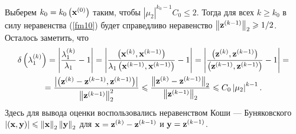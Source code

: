\documentclass[12pt]{article}
\begin{document}
	Выберем $k_0=k_0\left(\bold{x}^{\left(0\right)}\right)$ таким, чтобы $\left|\mu_2\right|^{k_0-1}C_0\leqslant 2$. Тогда для всех $k\geqslant k_0$ в силу неравенства (\ref{fm10}) будет справедливо неравенство $\left\|\bold{z}^{\left(k-1\right)}\right\|_2\geqslant 1/2$. Осталось заметить, что
	\begin{equation}
		\begin{gathered}
		\delta\left(\lambda_1^{\left(k\right)}\right)=\left|\frac{\lambda_1^{\left(k\right)}}{\lambda_1}-1\right|=\left|\frac{\left(\bold{x}^{\left(k\right)},\bold{x}^{\left(k-1\right)}\right)}{\lambda_1 \left(\bold{x}^{\left(k-1\right)},\bold{x}^{\left(k-1\right)}\right)}-1\right|=\left|\frac{\left(\bold{z}^{\left(k\right)},\bold{z}^{\left(k-1\right)}\right)}{\left(\bold{z}^{\left(k-1\right)},\bold{z}^{\left(k-1\right)}\right)}-1\right|=\\
		=\frac{\left|\left(\bold{z}^{\left(k\right)}-\bold{z}^{\left(k-1\right)},\bold{z}^{\left(k-1\right)}\right)\right|}{\left\|\bold{z}^{\left(k-1\right)}\right\|^2_2}\leqslant\frac{\left\|\bold{z}^{\left(k\right)}-\bold{z}^{\left(k-1\right)}\right\|_2}{\left\|\bold{z}^{\left(k-1\right)}\right\|_2}\leqslant C_0\left|\mu_2\right|^{k-1}.
		\end{gathered}
	\end{equation}
	Здесь для вывода оценки воспользовались неравенством Коши --- Буняковского $\left|\left(\bold{x},\bold{y}\right)\right|\leqslant \left\|\bold{x}\right\|_2\left\|\bold{y}\right\|_2$ для $\bold{x}=\bold{z}^{\left(k\right)}-\bold{z}^{\left(k-1\right)}$ и $\bold{y}=\bold{z}^{\left(k-1\right)}$.
	
\end{document}
